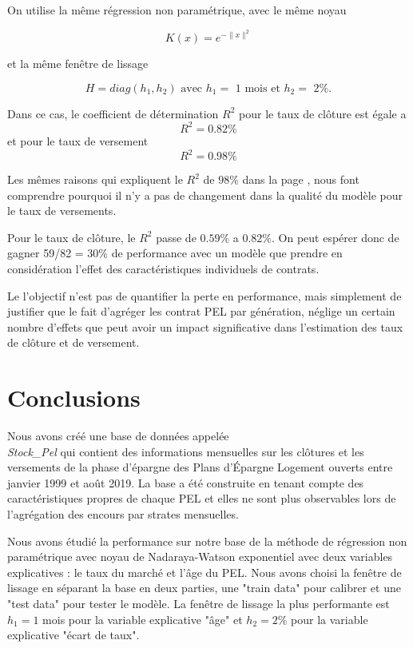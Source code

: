 \documentclass[12pt, a4paper]{book}
\begin{document}
On utilise la même régression non paramétrique, avec le même noyau

$$K(x)= e^{-\|x\|^2}$$

et la même fenêtre de lissage

$$ H=diag(h_1,h_2) \mbox{ avec $h_1=$ 1 mois et $h_2=$ 2\%}. $$

Dans ce cas, le coefficient de détermination $R^2$ pour le taux de clôture est égale a 
$$R^2 = 0.82\% $$
et pour le taux de versement
$$ R^2 = 0.98 \%$$

Les mêmes raisons qui expliquent le $R^2$ de $98\%$ dans la page \pageref{aqui}, nous font comprendre pourquoi il n'y a pas de changement dans la qualité du modèle pour le taux de versements.

Pour le taux de clôture, le $R^2$ passe de $0.59\%$ a $0.82\%$. On peut espérer donc de gagner 59/82 = 30\% de performance avec un modèle que prendre en considération l'effet des caractéristiques individuels de contrats. 

Le l'objectif n'est pas de quantifier la perte en performance, mais simplement de justifier que le fait d'agréger les contrat PEL  par génération, néglige  un certain nombre d'effets que peut avoir un impact significative dans l'estimation des taux de clôture et de versement.  

\section{Conclusions}

Nous avons créé une base de données appelée \\{\it Stock\_Pel} qui contient des informations mensuelles sur les clôtures et les versements de la phase d'épargne des Plans d'Épargne Logement ouverts entre janvier 1999 et août 2019. La base a été construite en tenant compte des caractéristiques propres de chaque PEL et elles ne sont plus observables lors de l'agrégation des encours par strates mensuelles. 

Nous avons étudié la performance sur notre base de la méthode de régression non paramétrique avec noyau de Nadaraya-Watson exponentiel avec deux variables explicatives : le taux du marché et l'âge du PEL. Nous avons choisi la fenêtre de lissage en séparant la base en deux parties, une "train data" pour calibrer et une "test data" pour tester le modèle. La fenêtre de lissage la plus performante est $h_1 = 1$ mois pour la variable explicative "âge" et $h_2 = 2\%$  pour la variable explicative "écart de taux". 
\end{document}
